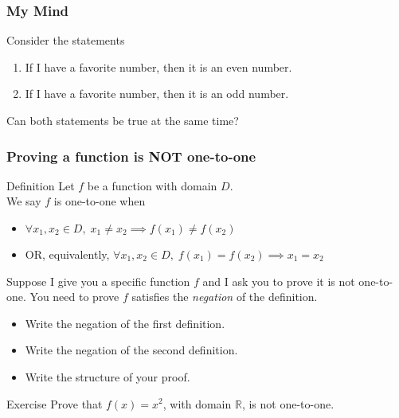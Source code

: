 \documentclass[14pt]{beamer}
\newcommand {\DS} [1] {${\displaystyle #1}$}
\newcommand {\R}{\mathbb{R}}
\newcommand{\p}{\pause}
\begin{document}
\begin{frame}
\frametitle{My Mind}
	Consider the statements
	\begin{enumerate}
		\item If I have a favorite number, then it is an even number.
		\item If I have a favorite number, then it is an odd number.
	\end{enumerate}
	Can both statements be true at the same time?
\vfill
\end{frame}


\begin{frame}[t]
\fontsize{13}{13}\selectfont
\frametitle{Proving a function is NOT one-to-one}

\begin{block}{Definition}
Let $f$ be a function with domain $D$. \\
We say $f$ is one-to-one when 
	\begin{itemize} 
		\item   \hfill \DS{\forall x_1, x_2 \in D, \; x_1 \neq x_2 \implies  f(x_1) \neq f(x_2)}
		\item    OR, equivalently, \hfill  \DS{\forall x_1, x_2 \in D, \; f(x_1) = f(x_2) \implies x_1 = x_2}
	\end{itemize}
\end{block}

\vfill  \p

Suppose I give you a specific function $f$ and I ask you to prove it is not one-to-one. \pause  You need to prove $f$ satisfies the \emph{negation} of the definition.
	\begin{itemize}
		\item  Write the negation of the first definition.
		\item  Write the negation of the second definition.
		\item  Write the structure of your proof. 
	\end{itemize}
	
\vfill	 \p

\begin{block}{Exercise}
	Prove that $f(x) =  x^2$, with domain $\R$, is not one-to-one.
\end{block}

\end{frame}
\end{document}
